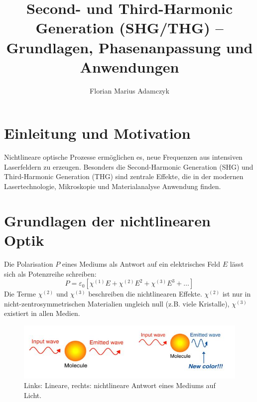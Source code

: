 \documentclass[9pt,a4paper,twocolumn,twoside]{tau-class/tau}
\title{Second- und Third-Harmonic Generation (SHG/THG) – Grundlagen, Phasenanpassung und Anwendungen}
\author[a,1]{Florian Marius Adamczyk}
\affil[a]{Justus-Liebig-Universität Gießen, Institut für Physik, Deutschland}
\begin{document}
		
    \maketitle 
    \thispagestyle{firststyle} 
    \tauabstract 
    

\section{Einleitung und Motivation}
Nichtlineare optische Prozesse ermöglichen es, neue Frequenzen aus intensiven Laserfeldern zu erzeugen. Besonders die Second-Harmonic Generation (SHG) und Third-Harmonic Generation (THG) sind zentrale Effekte, die in der modernen Lasertechnologie, Mikroskopie und Materialanalyse Anwendung finden.



\section{Grundlagen der nichtlinearen Optik}
Die Polarisation $P$ eines Mediums als Antwort auf ein elektrisches Feld $E$ lässt sich als Potenzreihe schreiben:
\begin{equation}
P = \varepsilon_0\left[\chi^{(1)}E + \chi^{(2)}E^2 + \chi^{(3)}E^3 + \dots\right]
\end{equation}
Die Terme $\chi^{(2)}$ und $\chi^{(3)}$ beschreiben die nichtlinearen Effekte. $\chi^{(2)}$ ist nur in nicht-zentrosymmetrischen Materialien ungleich null (z.B. viele Kristalle), $\chi^{(3)}$ existiert in allen Medien.

\begin{figure}[!ht]
\centering
\includegraphics[width=0.6\columnwidth]{../praes/Images/Fig.1 optics.jpeg}
\caption{Links: Lineare, rechts: nichtlineare Antwort eines Mediums auf Licht.\cite{Science20NonlinearOptics2014}}
\end{figure}
\end{document}
